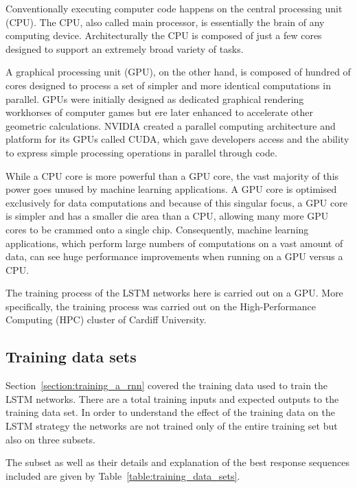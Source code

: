 Conventionally executing computer code happens on the central processing unit
(CPU). The CPU, also called main processor, is essentially the brain of any
computing device. Architecturally the CPU is composed of just a few cores
designed to support an extremely broad variety of tasks.

A graphical processing unit (GPU), on the other hand, is composed of hundred of
cores designed to process a set of simpler and more identical computations in
parallel. GPUs were initially designed as dedicated graphical rendering
workhorses of computer games but ere later enhanced to accelerate other
geometric calculations. NVIDIA created a parallel computing architecture and
platform for its GPUs called CUDA, which gave developers access and the ability
to express simple processing operations in parallel through code.

While a CPU core is more powerful than a GPU core, the vast majority of this
power goes unused by machine learning applications. A GPU core is optimised
exclusively for data computations and because of this singular focus, a GPU core
is simpler and has a smaller die area than a CPU, allowing many more GPU cores
to be crammed onto a single chip. Consequently, machine learning applications,
which perform large numbers of computations on a vast amount of data, can see
huge performance improvements when running on a GPU versus a CPU.

The training process of the LSTM networks here is carried out on a GPU. More
specifically, the training process was carried out on the High-Performance
Computing (HPC) cluster of Cardiff University.

\subsection{Training data sets}

Section~\ref{section:training_a_rnn} covered the training data used to train
the LSTM networks. There are a total \trainingpoint training inputs and expected
outputs to the training data set. In order to understand the effect of
the training data on the LSTM strategy the networks are not trained only of the
entire training set but also on three subsets.

The subset as well as their details and explanation of the best response sequences
included are given by Table~\ref{table:training_data_sets}.

